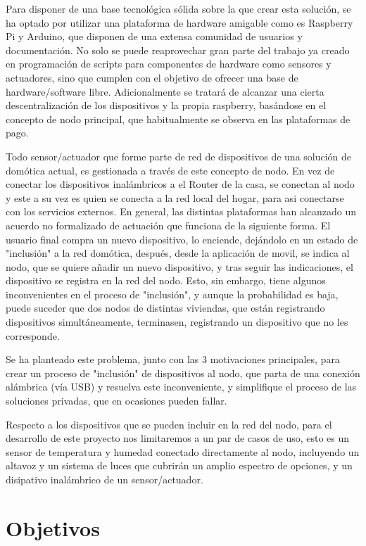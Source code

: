 Para disponer de una base tecnológica sólida sobre la que crear esta solución, se ha optado por utilizar una plataforma de hardware amigable como es Raspberry Pi y Arduino, que disponen de una extensa comunidad de usuarios y documentación. No solo se puede reaprovechar gran parte del trabajo ya creado en programación de scripts para componentes de hardware como sensores y actuadores, sino que cumplen con el objetivo de ofrecer una base de hardware/software libre. Adicionalmente se tratará de alcanzar una cierta descentralización de los dispositivos y la propia raspberry, basándose en el concepto de nodo principal, que habitualmente se observa en las plataformas de pago.

Todo sensor/actuador que forme parte de red de dispositivos de una solución de domótica actual, es gestionada a través de este concepto de nodo. En vez de conectar los dispositivos inalámbricos a el Router de la casa, se conectan al nodo y este a su vez es quien se conecta a la red local del hogar, para asi conectarse con los servicios externos. En general, las distintas plataformas han alcanzado un acuerdo no formalizado de actuación que funciona de la siguiente forma. El usuario final compra un nuevo dispositivo, lo enciende, dejándolo en un estado de "inclusión" a la red domótica, después, desde la aplicación de movil, se indica al nodo, que se quiere añadir un nuevo dispositivo, y tras seguir las indicaciones, el dispositivo se registra en la red del nodo. Esto, sin embargo, tiene algunos inconvenientes en el proceso de "inclusión", y aunque la probabilidad es baja, puede suceder que dos nodos de distintas viviendas, que están registrando dispositivos simultáneamente, terminasen, registrando un dispositivo que no les corresponde.

Se ha planteado este problema, junto con las 3 motivaciones principales, para crear un proceso de "inclusión" de dispositivos al nodo, que parta de una conexión alámbrica (vía USB) y resuelva este inconveniente, y simplifique el proceso de las soluciones privadas, que en ocasiones pueden fallar.

Respecto a los dispositivos que se pueden incluir en la red del nodo, para el desarrollo de este proyecto nos limitaremos a un par de casos de uso, esto es un sensor de temperatura y humedad conectado directamente al nodo, incluyendo un altavoz y un sistema de luces que cubrirán un amplio espectro de opciones, y un disipativo inalámbrico de un sensor/actuador.


\section{Objetivos}
\label{ch:Capitulo1.2}

